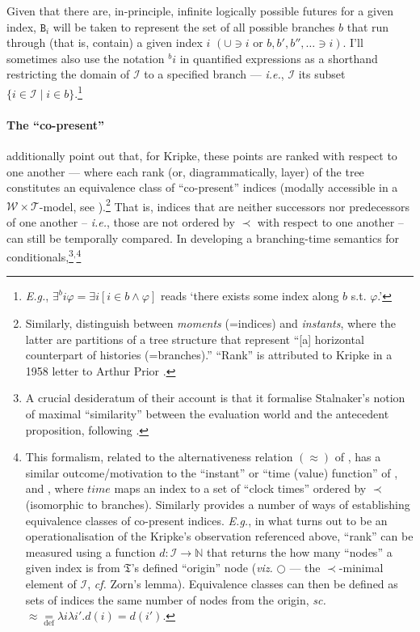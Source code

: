 \documentclass[12pt,dvipsnames]{report}
\begin{document}
\xe


Given that there are, in-principle, infinite logically possible futures for a given index,  $ \mathtt{B}_i $ will be taken to represent the set of all possible branches $ b $ that run through (that is, contain) a given index $ i $ $(\cup{\scriptstyle\!\ni}\!i\text{ or }b,b',b'',\hdots\ni i )$. I'll sometimes also use the notation $ {}^bi $ in quantified expressions as a shorthand restricting the domain of $ \mathcal I $ to a specified branch --- \textit{i.e.}, $ \mathcal I $ its subset $ \{i\in\mathcal I\mid i\in b\} $.\footnote{\textit{E.g.}, $ \exists^bi\varphi=\exists i[i\in b\wedge\varphi]$ reads `there exists some index along $ b $ s.t. $ \varphi $.'}



\paragraph{The ``co-present''} \citet{Øhrstrøm2020} additionally point out that, for Kripke, these points are ranked with respect to one another --- where each rank (or, diagrammatically, layer) of the tree constitutes an equivalence class of ``co-present'' indices (modally accessible in a $ \mathcal{W\times T }$-model, see \citealp*[95]{Kaufmann2006}).\footnote{Similarly, \citet[194\textit{ff}]{Belnap2001a} distinguish between \textit{moments} (=indices) and \textit{instants}, where the latter are partitions of a tree structure that represent ``[a] horizontal counterpart of histories (=branches).'' ``Rank'' is attributed to Kripke in a 1958 letter to Arthur Prior \citep[published in][373\textit{ff}]{Ploug2012}.} 
That is, indices that are neither successors nor predecessors of one another -- \textit{i.e.}, those are not ordered by $ \prec $ with respect to one another -- can still be temporally compared. In developing a branching-time semantics for conditionals,\footnote{A crucial desideratum of their account is that it formalise Stalnaker's notion of maximal ``similarity'' between the evaluation world and the antecedent proposition, following \citealp{Stalnaker1968,Stalnaker1970}.}$ ^, $\footnote{This formalism, related to the alternativeness relation $ (\approx )$ of \citet[149]{Thomason1984}, has a similar outcome/motivation to the ``instant'' or ``time (value) function'' of \citet[27]{Rumberg2016a}, \citet[195]{Belnap2001a} and \citet[592]{VonPrince2019}, where $ \mathit{time}$ maps an index to a set of ``clock times'' ordered by $ \prec $ (isomorphic to branches). Similarly \citet[102]{Landman1991} provides a number of ways of establishing equivalence classes of co-present indices. \textit{E.g.}, in what turns out to be an operationalisation of the Kripke's observation referenced above, ``rank'' can be measured using a function $ d:\mathcal I\to\mathbb N $ that returns the how many ``nodes'' a given index is from $ \mathfrak T $'s defined ``origin'' node (\textit{viz.} $ \bigcirc $ --- the $ \prec $-minimal element of $ \mathcal I $, \textit{cf.} Zorn's lemma). Equivalence classes can then be defined as sets of indices the same number of nodes from the origin, \textit{sc. }$ \approx\underset{\text{def}}{=}\lambda i\lambda i'.d(i)=d(i') $.} 
\end{document}

